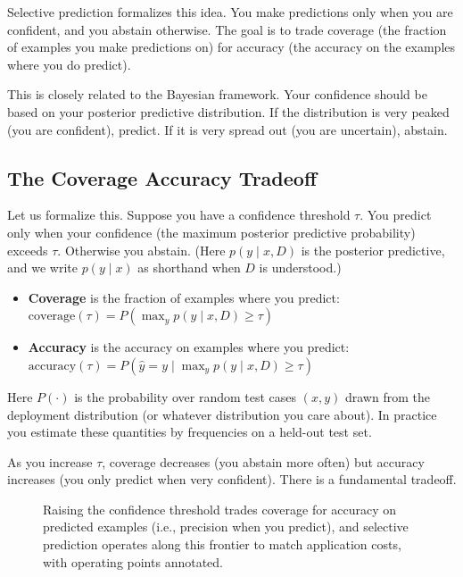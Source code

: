 Selective prediction formalizes this idea. You make predictions only when you are confident, and you abstain otherwise. The goal is to trade coverage (the fraction of examples you make predictions on) for accuracy (the accuracy on the examples where you do predict).

This is closely related to the Bayesian framework. Your confidence should be based on your posterior predictive distribution. If the distribution is very peaked (you are confident), predict. If it is very spread out (you are uncertain), abstain.

\subsection{The Coverage Accuracy Tradeoff}

Let us formalize this. Suppose you have a confidence threshold $\tau$. You predict only when your confidence (the maximum posterior predictive probability) exceeds $\tau$. Otherwise you abstain. (Here $p(y\mid x,D)$ is the posterior predictive, and we write $p(y\mid x)$ as shorthand when $D$ is understood.)

\begin{itemize}
\item \textbf{Coverage} is the fraction of examples where you predict: $\text{coverage}(\tau) = P(\max_y p(y \mid x, D) \geq \tau)$

\item \textbf{Accuracy} is the accuracy on examples where you predict: $\text{accuracy}(\tau) = P(\hat{y} = y \mid \max_y p(y \mid x, D) \geq \tau)$
\end{itemize}

\noindent Here $P(\cdot)$ is the probability over random test cases $(x,y)$ drawn from the deployment distribution (or whatever distribution you care about). In practice you estimate these quantities by frequencies on a held-out test set.

As you increase $\tau$, coverage decreases (you abstain more often) but accuracy increases (you only predict when very confident). There is a fundamental tradeoff.

\begin{figure}[t]
\centering

\caption{Raising the confidence threshold trades coverage for accuracy on predicted examples (i.e., precision when you predict), and selective prediction operates along this frontier to match application costs, with operating points annotated.}
\label{fig:coverage_accuracy}
\end{figure}


